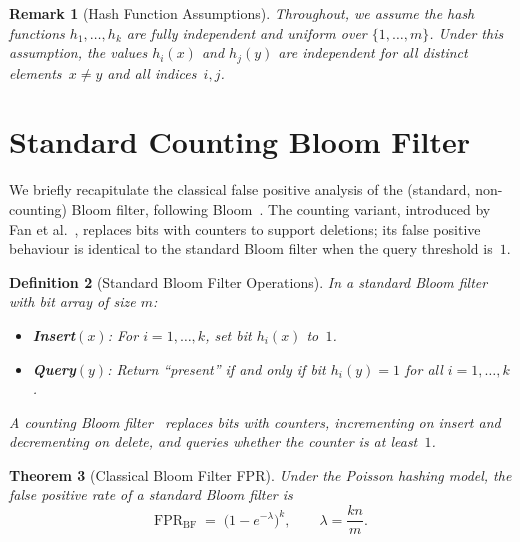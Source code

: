 \documentclass[11pt,a4paper]{article}
\newtheorem{theorem}{Theorem}[section]
\newtheorem{definition}[theorem]{Definition}
\newtheorem{remark}[theorem]{Remark}
\newcommand{\FPR}{\mathrm{FPR}}
\begin{document}
\begin{remark}[Hash Function Assumptions]\label{rem:hash}
Throughout, we assume the hash functions $h_1, \ldots, h_k$ are
\emph{fully independent} and \emph{uniform} over $\{1,\ldots,m\}$.
Under this assumption, the values $h_i(x)$ and $h_j(y)$ are independent
for all distinct elements~$x \ne y$ and all indices~$i, j$.
\end{remark}

\section{Standard Counting Bloom Filter}\label{sec:cbf}

We briefly recapitulate the classical false positive analysis of the
(standard, non-counting) Bloom filter, following Bloom~\cite{bloom1970}.
The counting variant, introduced by Fan et al.~\cite{fan2000}, replaces
bits with counters to support deletions; its false positive behaviour is
identical to the standard Bloom filter when the query threshold is~$1$.

\begin{definition}[Standard Bloom Filter Operations]\label{def:bf-ops}
In a standard Bloom filter with bit array of size $m$:
\begin{itemize}
  \item \textbf{Insert}$(x)$: For $i = 1, \ldots, k$, set bit $h_i(x)$
        to~$1$.
  \item \textbf{Query}$(y)$: Return ``present'' if and only if bit $h_i(y)
        = 1$ for all $i = 1, \ldots, k$.
\end{itemize}
A counting Bloom filter~\cite{fan2000} replaces bits with counters,
incrementing on insert and decrementing on delete, and queries whether the
counter is at least~$1$.
\end{definition}

\begin{theorem}[Classical Bloom Filter FPR]\label{thm:bf-fpr}
Under the Poisson hashing model, the false positive rate of a standard
Bloom filter is
\begin{equation}\label{eq:fpr-bf}
  \FPR_{\mathrm{BF}}
  \;=\; \bigl(1 - e^{-\lambda}\bigr)^{k},
  \qquad \lambda = \frac{kn}{m}.
\end{equation}
\end{theorem}
\end{document}
